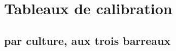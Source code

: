 ﻿\chapter{Tableaux de calibration}
\label{ann:calibration}

\section{ par culture, aux trois barreaux}

